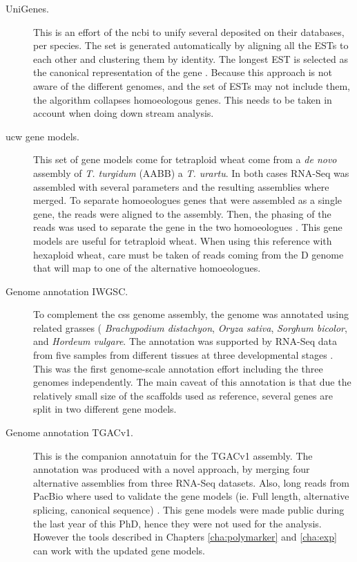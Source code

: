 \begin{description}
\item[UniGenes.] This is an effort of the \gls{ncbi} to unify several  deposited on their databases, per species.
The set is generated automatically by aligning all the ESTs to each other and clustering them by identity. 
The longest EST is selected as the canonical representation of the gene \citep{PontiusJUWagnerL2002}. 
Because this approach is not aware of the different genomes, and the set of ESTs may not include them, the algorithm  collapses homoeologous genes. 
This needs to be taken in account when doing down stream analysis. 
\item[\acrshort{ucw} gene models.] This set of gene models come for tetraploid wheat come from a \textit{de novo} assembly of \textit{T. turgidum} (AABB) a \textit{T. urartu}. 
In both cases RNA-Seq was assembled with several parameters and the resulting assemblies where merged. 
To separate homoeologues genes that were assembled as a single gene, the reads were aligned to the assembly.
Then, the phasing of the reads was used to separate the gene in the two homoeologues \citep{Krasileva2013}.
This gene models are useful for tetraploid wheat. 
When using this reference with hexaploid wheat, care must be taken of reads coming from the D genome that will map to one of the alternative homoeologues. 
\item[Genome annotation IWGSC.] To complement the \acrshort{css} genome assembly, the genome was annotated using related grasses ( \textit{Brachypodium distachyon}, \textit{Oryza sativa}, \textit{Sorghum bicolor}, and \textit{Hordeum vulgare}. 
The annotation was supported by RNA-Seq data from five samples from different tissues at three developmental stages \citep{Mayer2014}. 
This was the first genome-scale annotation effort including the three genomes independently. 
The main caveat of this annotation is that due the relatively small size of the scaffolds used as reference, several genes are split in two different gene models. 
\item[Genome annotation TGACv1.] This is the companion annotatuin for the TGACv1 assembly. 
The annotation was produced with a novel approach, by merging four alternative assemblies from three RNA-Seq datasets. 
Also, long reads from PacBio where used to validate the gene models (ie. Full length, alternative splicing, canonical sequence) \citep{Venturini2016}. 
This gene models were made public during the last year of this PhD, hence they were not used for the analysis. 
However the tools described in Chapters \ref{cha:polymarker} and \ref{cha:exp} can work with the updated gene models. 
\end{description}



